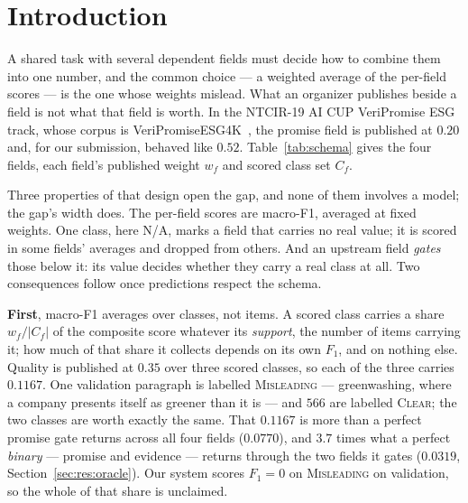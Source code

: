 \section{Introduction}
\label{sec:intro}

A shared task with several dependent fields must decide how to combine them into one number, and
the common choice --- a weighted average of the per-field scores --- is the one whose weights
mislead. What an organizer publishes beside a field is not what that field is worth. In the NTCIR-19 AI CUP VeriPromise ESG track,
whose corpus is VeriPromiseESG4K~\cite{day2026veripromiseesg4k}, the promise field is published
at $0.20$ and, for our submission, behaved like $0.52$. Table~\ref{tab:schema} gives the four
fields, each field's published weight $w_f$ and scored class set $C_f$.

Three properties of that design open the gap, and none of them involves a model; the gap's width does. The per-field
scores are macro-F1, averaged at fixed weights. One class, here N/A, marks a field that carries
no real value; it is scored in some fields' averages and dropped from others. And an upstream
field \emph{gates} those below it: its value decides whether they carry a real class at all. Two
consequences follow once predictions respect the schema.

\textbf{First}, macro-F1 averages over classes, not items. A scored class carries a share
$w_f/|C_f|$ of the composite score whatever its \emph{support}, the number of items carrying it;
how much of that share it collects depends on its own $F_1$, and on nothing else. Quality is
published at $0.35$ over three scored classes, so each of the three carries $0.1167$. One validation paragraph is labelled
\textsc{Misleading} --- greenwashing, where a company presents itself as greener than it is ---
and $566$ are labelled \textsc{Clear}; the two classes are worth exactly the same. That $0.1167$
is more than a perfect promise gate returns across all four fields ($0.0770$), and $3.7$ times
what a perfect \emph{binary} --- promise and evidence --- returns through the two fields it
gates ($0.0319$,
Section~\ref{sec:res:oracle}). Our system scores $F_1 = 0$ on \textsc{Misleading} on validation,
so the whole of that share is unclaimed.

